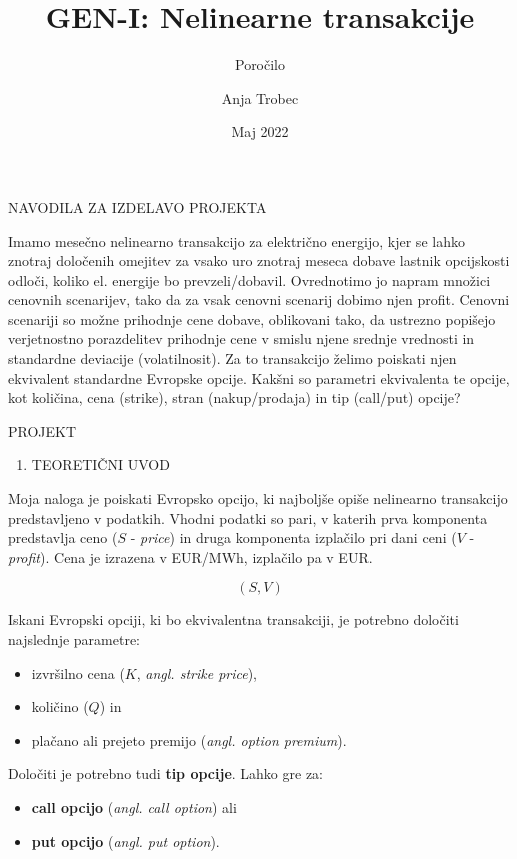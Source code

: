 \documentclass[
]{article}
\title{GEN-I: Nelinearne transakcije}
\subtitle{Poročilo}
\author{Anja Trobec}
\date{Maj 2022}
\providecommand{\tightlist}{%
  \setlength{\itemsep}{0pt}\setlength{\parskip}{0pt}}
\begin{document}
\maketitle

NAVODILA ZA IZDELAVO PROJEKTA

Imamo mesečno nelinearno transakcijo za električno energijo, kjer se
lahko znotraj določenih omejitev za vsako uro znotraj meseca dobave
lastnik opcijskosti odloči, koliko el. energije bo prevzeli/dobavil.
Ovrednotimo jo napram množici cenovnih scenarijev, tako da za vsak
cenovni scenarij dobimo njen profit. Cenovni scenariji so možne
prihodnje cene dobave, oblikovani tako, da ustrezno popišejo
verjetnostno porazdelitev prihodnje cene v smislu njene srednje
vrednosti in standardne deviacije (volatilnosit). Za to transakcijo
želimo poiskati njen ekvivalent standardne Evropske opcije. Kakšni so
parametri ekvivalenta te opcije, kot količina, cena (strike), stran
(nakup/prodaja) in tip (call/put) opcije?

PROJEKT

\begin{enumerate}
\def\labelenumi{\arabic{enumi}.}
\tightlist
\item
  TEORETIČNI UVOD
\end{enumerate}

Moja naloga je poiskati Evropsko opcijo, ki najboljše opiše nelinearno
transakcijo predstavljeno v podatkih. Vhodni podatki so pari, v katerih
prva komponenta predstavlja ceno (\emph{\(S\)} - \emph{price}) in druga
komponenta izplačilo pri dani ceni (\emph{\(V\)} - \emph{profit}). Cena
je izrazena v EUR/MWh, izplačilo pa v EUR.

\[(S,V) \]

Iskani Evropski opciji, ki bo ekvivalentna transakciji, je potrebno
določiti najslednje parametre:

\begin{itemize}
\tightlist
\item
  izvršilno cena (\(K\), \emph{angl. strike price}),
\item
  količino (\(Q\)) in
\item
  plačano ali prejeto premijo (\emph{angl. option premium}).
\end{itemize}

Določiti je potrebno tudi \textbf{tip opcije}. Lahko gre za:

\begin{itemize}
\tightlist
\item
  \textbf{call opcijo} (\emph{angl. call option}) ali
\item
  \textbf{put opcijo} (\emph{angl. put option}).
\end{itemize}
\end{document}
